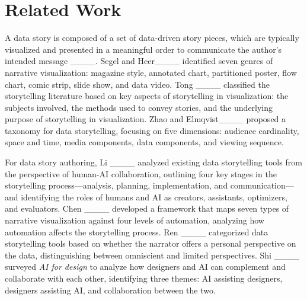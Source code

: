 \section{Related Work}
\label{sec:related}
A data story is composed of a set of data-driven story pieces, which are typically visualized and presented in a meaningful order to communicate the author's intended message ____. 
Segel and Heer____ identified seven genres of narrative visualization: magazine style, annotated chart, partitioned poster, flow chart, comic strip, slide show, and data video. 
Tong \etal____ classified the storytelling literature based on key aspects of storytelling in visualization: the subjects involved, the methods used to convey stories, and the underlying purpose of storytelling in visualization.
Zhao and Elmqvist____ proposed a taxonomy for data storytelling, focusing on five dimensions: audience cardinality, space and time, media components, data components, and viewing sequence.

For data story authoring, 
Li \etal____ analyzed existing data storytelling tools from the perspective of human-AI collaboration, outlining four key stages in the storytelling process—analysis, planning, implementation, and communication—and identifying the roles of humans and AI as creators, assistants, optimizers, and evaluators. 
Chen \etal____ developed a framework that maps seven types of narrative visualization against four levels of automation, analyzing how automation affects the storytelling process.
Ren \etal____ categorized data storytelling tools based on whether the narrator offers a personal perspective on the data, distinguishing between omniscient and limited perspectives. 
Shi \etal____ surveyed \textit{AI for design} to analyze how designers and AI can complement and collaborate with each other, identifying three themes: AI assisting designers, designers assisting AI, and collaboration between the two. 

